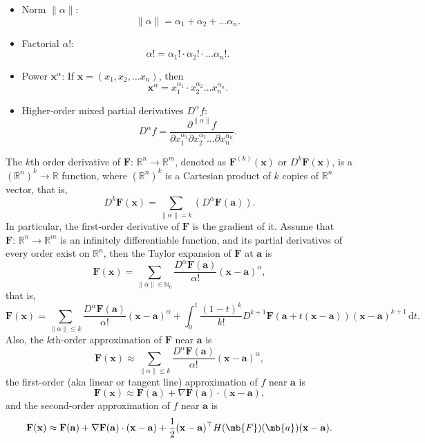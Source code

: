 \documentclass[a4paper,12pt]{report}
\begin{document}
\begin{itemize}
\begin{itemize}
\begin{itemize}
\item Norm \( \|\alpha\| \): 
\[
\|\alpha\| = \alpha_1 + \alpha_2 + \ldots\alpha_n.
\]
\item Factorial \( \alpha! \): 
\[
\alpha! = \alpha_1! \cdot \alpha_2! \cdot \ldots \alpha_n!.
\]
\item Power \( \mathbf{x}^\alpha \): 
If \( \mathbf{x} = (x_1, x_2, \ldots x_n) \), then
\[
\mathbf{x}^\alpha = x_1^{\alpha_1} \cdot x_2^{\alpha_2} \ldots  x_n^{\alpha_n}.
\]
\item Higher-order mixed partial derivatives $D^\alpha f$: 
\[
D^\alpha f = \frac{\partial^{\|\alpha\|} f}{\partial x_1^{\alpha_1} \partial x_2^{\alpha_2} \ldots  \partial x_n^{\alpha_n}}.
\]
\end{itemize}
The $k$th order derivative of $\mathbf{F}:\,\mathbb{R}^n\to\mathbb{R}^m$, denoted as $\mathbf{F}^{(k)}(\mathbf{x})$ or $D^{k}\mathbf{F}(\mathbf{x})$, is a $(\mathbb{R}^n)^k\to\mathbb{R}$ function, where $(\mathbb{R}^n)^k$ is a Cartesian product of $k$ copies of $\mathbb{R}^n$ vector, that is,
\[D^{k}\mathbf{F}(\mathbf{x})=\sum_{\|\alpha\|=k} \left(D^\alpha \mathbf{F}(\mathbf{a})\right).\]
In particular, the first-order derivative of $\mathbf{F}$ is the gradient of it.
Assume that $\mathbf{F}:\,\mathbb{R}^n\to\mathbb{R}^m$ is an infinitely differentiable function, and its partial derivatives of every order exist on $\mathbb{R}^n$, then the Taylor expansion of $\mathbf{F}$ at $\mathbf{a}$ is
\[\mathbf{F}(\mathbf{x}) = \sum_{\|\alpha\|\in\mathbb{N}_0} \frac{D^\alpha \mathbf{F}(\mathbf{a})}{\alpha!} (\mathbf{x} - \mathbf{a})^\alpha,\]
that is,
\[\mathbf{F}(\mathbf{x}) = \sum_{\|\alpha\|\leq k} \frac{D^\alpha \mathbf{F}(\mathbf{a})}{\alpha!} (\mathbf{x} - \mathbf{a})^\alpha+\int_0^1\frac{(1-t)^k}{k!} D^{k+1}\mathbf{F}(\mathbf{a} + t(\mathbf{x} - \mathbf{a})) (\mathbf{x} - \mathbf{a})^{k+1} \, \mathrm{d}t.\]
Also, the $k$th-order approximation of $\mathbf{F}$ near $\mathbf{a}$ is
\[\mathbf{F}(\mathbf{x}) \approx \sum_{\|\alpha\|\leq k} \frac{D^\alpha \mathbf{F}(\mathbf{a})}{\alpha!} (\mathbf{x} - \mathbf{a})^\alpha,\]
the first-order (aka linear or tangent line) approximation of $f$ near $\mathbf{a}$ is
\[\mathbf{F}(\mathbf{x}) \approx \mathbf{F}(\mathbf{a}) + \nabla \mathbf{F}(\mathbf{a}) \cdot (\mathbf{x} - \mathbf{a}),\]
and the second-order approximation of $f$ near $\mathbf{a}$ is
\[\mathbf{F}(\mathbf{x}) \approx \mathbf{F}(\mathbf{a}) + \nabla \mathbf{F}(\mathbf{a}) \cdot (\mathbf{x} - \mathbf{a}) + \frac{1}{2}(\mathbf{x} - \mathbf{a})^\top H(\mb{F})(\mb{a})(\mathbf{x} - \mathbf{a}).\]

\end{itemize}
\end{itemize}
\end{document}
